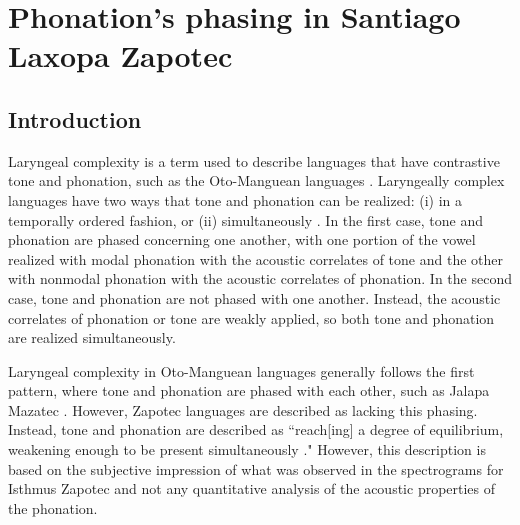 \chapter{Phonation's phasing in Santiago Laxopa Zapotec} \label{ch:testing_lc}

\section{Introduction}\label{sec:introduction_of_lc}
Laryngeal complexity is a term used to describe languages that have contrastive tone and phonation, such as the Oto-Manguean languages \citep{blankenshipTimeCourseBreathiness1997,blankenshipTimingNonmodalPhonation2002,silvermanLaryngealComplexityOtomanguean1997,silvermanPhasingRecoverability1997}. Laryngeally complex languages have two ways that tone and phonation can be realized: (i) in a temporally ordered fashion, or (ii) simultaneously \citep{silvermanLaryngealComplexityOtomanguean1997}. In the first case, tone and phonation are phased concerning one another, with one portion of the vowel realized with modal phonation with the acoustic correlates of tone and the other with nonmodal phonation with the acoustic correlates of phonation. In the second case, tone and phonation are not phased with one another. Instead, the acoustic correlates of phonation or tone are weakly applied, so both tone and phonation are realized simultaneously.

Laryngeal complexity in Oto-Manguean languages generally follows the first pattern, where tone and phonation are phased with each other, such as Jalapa Mazatec \citep{blankenshipTimeCourseBreathiness1997,blankenshipTimingNonmodalPhonation2002,silvermanLaryngealComplexityOtomanguean1997,silvermanPhasingRecoverability1997}. However, Zapotec languages are described as lacking this phasing. Instead, tone and phonation are described as ``reach[ing] a degree of equilibrium, weakening enough to be present simultaneously \citep[558]{herrerazendejasAmuzgoZapotecTwo2000}." However, this description is based on the subjective impression of what was observed in the spectrograms for Isthmus Zapotec and not any quantitative analysis of the acoustic properties of the phonation.  

